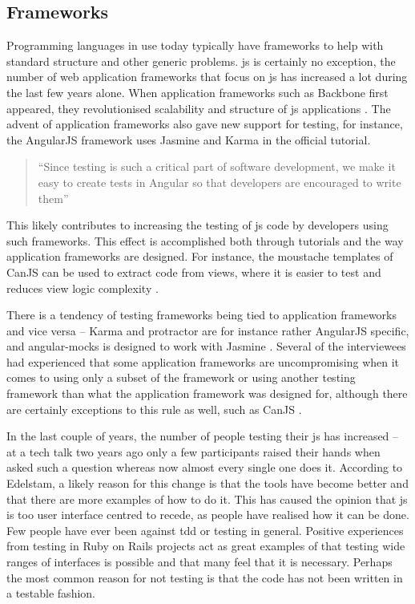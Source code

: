 \documentclass[11pt]{article}
\begin{document}
\subsection{Frameworks}
\label{subsec:frameworks}

Programming languages in use today typically have frameworks to help with standard structure and other generic problems. \gls{js} is certainly no exception, the number of web application frameworks that focus on \gls{js} has increased a lot during the last few years alone. When application frameworks such as Backbone first appeared, they revolutionised scalability and structure of \gls{js} applications \cite[question~23]{Ahnve}\cite[question~11]{Rovegard}. The advent of application frameworks also gave new support for testing, for instance, the AngularJS framework uses Jasmine and Karma in the official tutorial.

\begin{quote}
``Since testing is such a critical part of software development, we make it easy to create tests in Angular so that developers are encouraged to write them'' \cite{AngularTemplates}
\end{quote}

This likely contributes to increasing the testing of \gls{js} code by developers using such frameworks. This effect is accomplished both through tutorials and the way application frameworks are designed. For instance, the moustache templates of CanJS can be used to extract code from views, where it is easier to test and reduces view logic complexity \cite[question~32]{Ahnve}.

There is a tendency of testing frameworks being tied to application frameworks and vice versa -- Karma and protractor are for instance rather AngularJS specific, and angular-mocks is designed to work with Jasmine \cite[question~7]{Rovegard}. Several of the interviewees had experienced that some application frameworks are uncompromising when it comes to using only a subset of the framework or using another testing framework than what the application framework was designed for, although there are certainly exceptions to this rule as well, such as CanJS \cite[question~22]{Ahnve}\cite[question~41]{Rovegard}.

In the last couple of years, the number of people testing their \gls{js} has increased -- at a tech talk two years ago only a few participants raised their hands when asked such a question whereas now almost every single one does it. \cite[question~1]{Edelstam} According to Edelstam, a likely reason for this change is that the tools have become better and that there are more examples of how to do it. This has caused the opinion that \gls{js} is too user interface centred to recede, as people have realised how it can be done. Few people have ever been against \gls{tdd} or testing in general. Positive experiences from testing in Ruby on Rails projects act as great examples of that testing wide ranges of interfaces is possible and that many feel that it is necessary. Perhaps the most common reason for not testing is that the code has not been written in a testable fashion. \cite[questions~2-3]{Edelstam}
\end{document}
